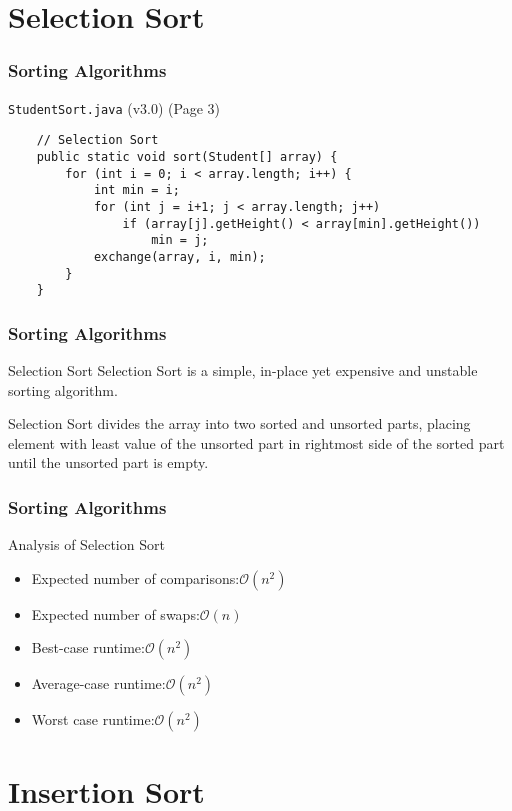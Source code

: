 \documentclass[10pt, compress]{beamer}
\begin{document}
\section{Selection Sort}

\begin{frame}[fragile]
	\frametitle{Sorting Algorithms}
	\begin{block}{\texttt{StudentSort.java} (v3.0) (Page 3)}
		\begin{verbatim}
	// Selection Sort
	public static void sort(Student[] array) {
		for (int i = 0; i < array.length; i++) {
			int min = i;
			for (int j = i+1; j < array.length; j++)
				if (array[j].getHeight() < array[min].getHeight())
					min = j;
			exchange(array, i, min);
		}
	}
		\end{verbatim}
	\end{block}
\end{frame}

\begin{frame}[fragile]
	\frametitle{Sorting Algorithms}
	\begin{block}{Selection Sort}
		Selection Sort is a simple, in-place yet expensive and unstable sorting algorithm.

		Selection Sort divides the array into two sorted and unsorted parts, placing element with least value of the unsorted part in rightmost side of the sorted part until the unsorted part is empty.
	\end{block}
\end{frame}

\begin{frame}[fragile]
	\frametitle{Sorting Algorithms}
	\begin{block}{Analysis of Selection Sort}
		\begin{itemize}
			\item[] Expected number of comparisons:\hfill $\mathcal{O}(n^2)$
			\item[] Expected number of swaps:\hfill $\mathcal{O}(n)$
			\item[] Best-case runtime:\hfill $\mathcal{O}(n^2)$
			\item[] Average-case runtime:\hfill $\mathcal{O}(n^2)$
			\item[] Worst case runtime:\hfill $\mathcal{O}(n^2)$
		\end{itemize}
	\end{block}
\end{frame}

\section{Insertion Sort}
\end{document}
